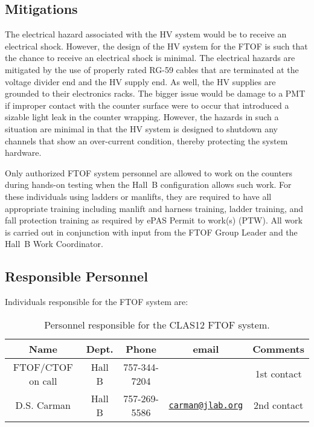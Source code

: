 \subsection{Mitigations}

The electrical hazard associated with the HV system would be to receive an electrical 
shock. However, the design of the HV system for the FTOF is such that the chance to 
receive an electrical shock is minimal. The electrical hazards are mitigated by the use 
of properly rated RG-59 cables that are terminated at the voltage divider end and the HV 
supply end. As well, the HV supplies are grounded to their electronics racks. The bigger 
issue would be damage to a PMT if improper contact with the counter surface were to occur 
that introduced a sizable light leak in the counter wrapping. However, the hazards in such 
a situation are minimal in that the HV system is designed to shutdown any channels that 
show an over-current condition, thereby protecting the system hardware. 

Only authorized FTOF system personnel are allowed to work on the counters during hands-on
testing when the Hall~B configuration allows such work. For these individuals using ladders 
or manlifts, they are required to have all appropriate training including manlift and
harness training, ladder training, and fall protection training as required by ePAS Permit
to work(s) (PTW).  All work is carried out in conjunction with input from the FTOF Group
Leader and the Hall~B Work Coordinator.

\subsection{Responsible Personnel}

Individuals responsible for the FTOF system are:

\begin{table}[!htb]
\centering
\begin{tabular}{|c|c|c|c|c|} \hline
Name              & Dept.  & Phone        & email & Comments \\ \hline
FTOF/CTOF on call & Hall B & 757-344-7204 &       & 1st contact \\ \hline
D.S. Carman       & Hall B & 757-269-5586 & \href{mailto:carman@jlab.org}{\nolinkurl{carman@jlab.org}} & 2nd contact \\ \hline
\end{tabular}
\caption{Personnel responsible for the CLAS12 FTOF system.} 
\label{tb:ftof}
\end{table}

